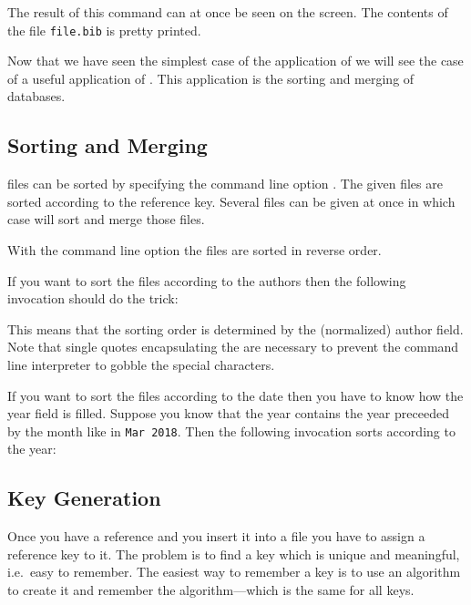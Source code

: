 \documentclass[11pt,a4paper]{scrbook}
\begin{document}

The result of this command can at once be seen on the screen. The contents of
the file \texttt{file.bib} is pretty printed.


Now that we have seen the simplest case of the application of \BibTool{} we
will see the case of a useful application of \BibTool. This application is the
sorting and merging of \BibTeX{} databases.


\subsection{Sorting and Merging}\label{sample.sort}

\BibTeX{} files can be sorted by specifying the command line option .
The given files are sorted according to the reference key. Several files can
be given at once in which case \BibTool{} will sort and merge those files.


With the command line option  the files are sorted in reverse \ASCII{}
order.


If you want to sort the \BibTeX{} files according to the authors then the
following invocation should do the trick:


This means that the sorting order is determined by the (normalized) author
field. Note that single quotes encapsulating the  are
necessary to prevent the command line interpreter to gobble the special
characters.


If you want to sort the \BibTeX{} files according to the date then you have to
know how the year field is filled. Suppose you know that the year contains the
year preceeded by the month like in \texttt{Mar 2018}. Then the following
invocation sorts according to the year:



\subsection{Key Generation}

Once you have a reference and you insert it into a \BibTeX{} file you have to
assign a reference key to it. The problem is to find a key which is unique and
meaningful, i.e.\ easy to remember. The easiest way to remember a key is to
use an algorithm to create it and remember the algorithm---which is the same
for all keys.
\end{document}
